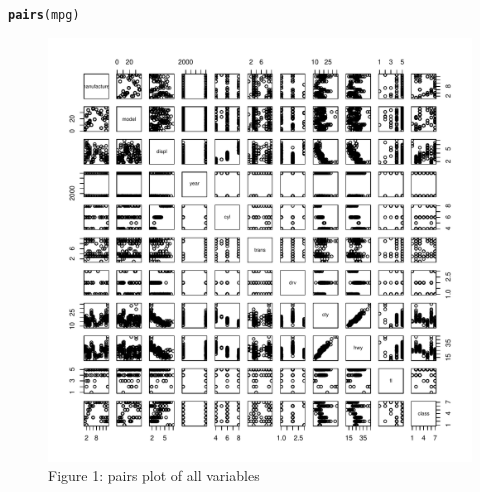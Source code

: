 \documentclass{article}\usepackage[]{graphicx}\usepackage[]{color}
\makeatletter
\def\maxwidth{ %
  \ifdim\Gin@nat@width>\linewidth
    \linewidth
  \else
    \Gin@nat@width
  \fi
}
\newcommand{\hlstd}[1]{\textcolor[rgb]{0.345,0.345,0.345}{#1}}%
\newcommand{\hlkwd}[1]{\textcolor[rgb]{0.737,0.353,0.396}{\textbf{#1}}}%
\newenvironment{kframe}{%
 \def\at@end@of@kframe{}%
 \ifinner\ifhmode%
  \def\at@end@of@kframe{\end{minipage}}%
  \begin{minipage}{\columnwidth}%
 \fi\fi%
 \def\FrameCommand##1{\hskip\@totalleftmargin \hskip-\fboxsep
 \colorbox{shadecolor}{##1}\hskip-\fboxsep
     \hskip-\linewidth \hskip-\@totalleftmargin \hskip\columnwidth}%
 \MakeFramed {\advance\hsize-\width
   \@totalleftmargin\z@ \linewidth\hsize
   \@setminipage}}%
 {\par\unskip\endMakeFramed%
 \at@end@of@kframe}
\newenvironment{knitrout}{}{} %
\makeatother
\begin{document}
\begin{knitrout}
\color{fgcolor}\begin{kframe}
\begin{alltt}
\hlkwd{pairs}\hlstd{(mpg)}
\end{alltt}
\end{kframe}\begin{figure}
\includegraphics[width=\maxwidth]{figure/plot01-1} \caption[Figure 1]{Figure 1: pairs plot of all variables}\label{fig:plot01}
\end{figure}


\end{knitrout}
\end{document}
